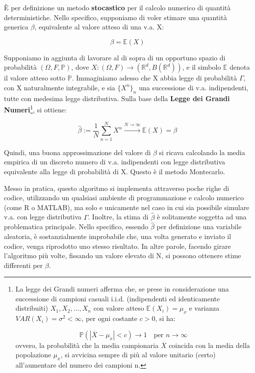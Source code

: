 \documentclass[12pt,a4paper]{report}
\begin{document}
È per definizione un metodo \textbf{stocastico} per il calcolo numerico di quantità deterministiche. Nello specifico, supponiamo di voler stimare una quantità generica $\beta$, equivalente al valore atteso di una v.a. X:

\begin{equation}
    \beta = \mathbb{E}(X)
\end{equation}

Supponiamo in aggiunta di lavorare al di sopra di un opportuno spazio di probabilità $(\Omega, \mathit{F}, \mathbb{P})$, dove $X : (\Omega, \mathit{F}) \rightarrow (\mathbb{R}^{d}, \mathit{B}(\mathbb{R}^{d}))$, e il simbolo $\mathbb{E}$ denota il valore atteso sotto $\mathbb{P}$. Immaginiamo adesso che X abbia legge di probabilità $\Gamma$, con X naturalmente integrabile, e sia $\{X^{n}\}_{n}$ una successione di v.a. indipendenti, tutte con medesima legge distributiva. Sulla base della \textbf{Legge dei Grandi Numeri}\footnote{La legge dei Grandi numeri afferma che, se prese in considerazione una successione di campioni casuali i.i.d. (indipendenti ed identicamente distribuiti) $X_1, X_2, ..., X_n$ con valore atteso $\mathbb{E}(X_i) = \mu_x$ e varianza $VAR(X_i) = \sigma^2 < \infty$, per ogni costante $c > 0$, si ha:

\begin{equation*}
\mathbb{P}(|\overline{X} - \mu_x| < c) \rightarrow 1 \quad \text{per } n \rightarrow \infty
\end{equation*}
ovvero, la probabilità che la media campionaria $\overline{X}$ coincida con la media della popolazione $\mu_x$, si avvicina sempre di più al valore unitario (certo) all'aumentare del numero dei campioni n.}, si ottiene: 

\begin{equation}
    \hat{\beta} := \frac{1}{N}\sum_{n=1}^{N}{X^{n}} \overset{N \to \infty}{\xrightarrow{}} \mathbb{E}(X) = \beta
\end{equation}

Quindi, una buona approssimazione del valore di $\beta$ si ricava calcolando la media empirica di un discreto numero di v.a. indipendenti con legge distributiva equivalente alla legge di probabilità di X. Questo è il metodo Montecarlo.

Messo in pratica, questo algoritmo si implementa attraverso poche righe di codice, utilizzando un qualsiasi ambiente di programmazione e calcolo numerico (come R o MATLAB), ma solo e unicamente nel caso in cui sia possibile simulare v.a. con legge distributiva $\Gamma$. Inoltre, la stima di $\hat{\beta}$ è solitamente soggetta ad una problematica principale. Nello specifico, essendo $\hat{\beta}$ per definizione una variabile aleatoria, è sostanzialmente improbabile che, una volta generato e inviato il codice, venga riprodotto uno stesso risultato. In altre parole, facendo girare l'algoritmo più volte, fissando un valore elevato di N, si possono ottenere stime differenti per $\beta$.
\end{document}

